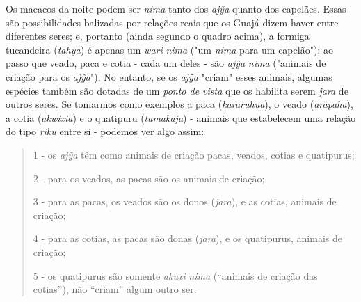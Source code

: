 Os macacos-da-noite podem ser \emph{nima} tanto dos \emph{ajỹa} quanto
dos capelães. Essas são possibilidades balizadas por relações reais que
os Guajá dizem haver entre diferentes seres; e, portanto (ainda segundo
o quadro acima), a formiga tucandeira (\emph{tahya}) é apenas um
\emph{wari} \emph{nima} ("um \emph{nima} para um capelão"); ao passo que
veado, paca e cotia - cada um deles - são \emph{ajỹa} \emph{nima}
("animais de criação para os \emph{ajỹa}"). No entanto, se os
\emph{ajỹa} "criam" esses animais, algumas espécies também são dotadas
de um \emph{ponto de vista} que os habilita serem \emph{jara} de outros
seres. Se tomarmos como exemplos a paca (\emph{kararuhua}), o veado
(\emph{arapaha}), a cotia (\emph{akwixia}) e o quatipuru
(\emph{tamakaja}) - animais que estabelecem uma relação do tipo
\emph{riku} entre si - podemos ver algo assim:

\begin{quote}
1 - os \emph{ajỹa} têm como animais de criação pacas, veados, cotias e
quatipurus;

2 - para os veados, as pacas são os animais de criação;

3 - para as pacas, os veados são os donos (\emph{jara}), e as cotias,
animais de criação;

4 - para as cotias, as pacas são donas (\emph{jara}), e os quatipurus,
animais de criação;

5 - os quatipurus são somente \emph{akuxi} \emph{nima} (``animais de
criação das cotias''), não ``criam'' algum outro ser.
\end{quote}




